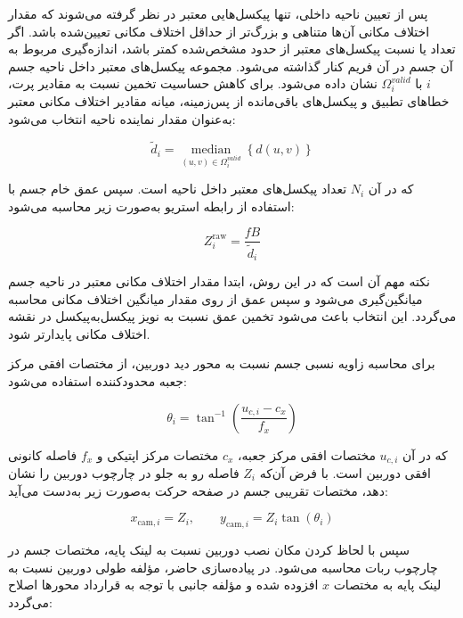 پس از تعیین ناحیه داخلی، تنها پیکسل‌هایی معتبر در نظر گرفته می‌شوند
که مقدار اختلاف مکانی آن‌ها متناهی و بزرگ‌تر از حداقل اختلاف مکانی
تعیین‌شده باشد. اگر تعداد یا نسبت پیکسل‌های معتبر از حدود مشخص‌شده
کمتر باشد، اندازه‌گیری مربوط به آن جسم در آن فریم کنار گذاشته می‌شود.
مجموعه پیکسل‌های معتبر داخل ناحیه جسم \(i\) با
\(\Omega_i^{valid}\) نشان داده می‌شود. برای کاهش حساسیت تخمین نسبت
به مقادیر پرت، خطاهای تطبیق و پیکسل‌های باقی‌مانده از پس‌زمینه،
میانه مقادیر اختلاف مکانی معتبر به‌عنوان مقدار نماینده ناحیه انتخاب
می‌شود:

\begin{equation}
	\tilde{d}_i =
	\underset{(u,v)\in\Omega_i^{valid}}{\operatorname{median}}
	\left\{d(u,v)\right\}
	\label{eq:median_valid_disparity}
\end{equation}

که در آن \(N_i\) تعداد پیکسل‌های معتبر داخل ناحیه است. سپس عمق خام جسم با استفاده از رابطه استریو به‌صورت زیر محاسبه می‌شود:

\begin{equation}
	Z_i^{\mathrm{raw}} =
	\frac{fB}{\tilde{d}_i}
	\label{eq:obstacle_raw_depth}
\end{equation}

نکته مهم آن است که در این روش، ابتدا مقدار اختلاف مکانی معتبر در ناحیه جسم میانگین‌گیری می‌شود و سپس عمق از روی مقدار میانگین اختلاف مکانی محاسبه می‌گردد. این انتخاب باعث می‌شود تخمین عمق نسبت به نویز پیکسل‌به‌پیکسل در نقشه اختلاف مکانی پایدارتر شود.

برای محاسبه زاویه نسبی جسم نسبت به محور دید دوربین، از مختصات افقی مرکز جعبه محدودکننده استفاده می‌شود:

\begin{equation}
	\theta_i =
	\tan^{-1}
	\left(
	\frac{u_{c,i}-c_x}{f_x}
	\right)
	\label{eq:obstacle_bearing}
\end{equation}

که در آن \(u_{c,i}\) مختصات افقی مرکز جعبه، \(c_x\) مختصات مرکز اپتیکی و \(f_x\) فاصله کانونی افقی دوربین است. با فرض آن‌که \(Z_i\) فاصله رو به جلو در چارچوب دوربین را نشان دهد، مختصات تقریبی جسم در صفحه حرکت به‌صورت زیر به‌دست می‌آید:

\begin{equation}
	x_{\text{cam},i} = Z_i,
	\qquad
	y_{\text{cam},i} = Z_i \tan(\theta_i)
	\label{eq:camera_xy_from_depth}
\end{equation}

سپس با لحاظ کردن مکان نصب دوربین نسبت به لینک پایه، مختصات جسم در چارچوب ربات محاسبه می‌شود. در پیاده‌سازی حاضر، مؤلفه طولی دوربین نسبت به لینک پایه به مختصات \(x\) افزوده شده و مؤلفه جانبی با توجه به قرارداد محورها اصلاح می‌گردد:

